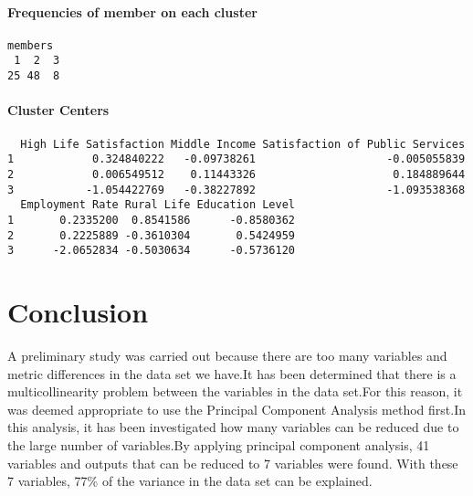 \documentclass[12pt,twoside]{deuthesis}
\newenvironment{Shaded}{\begin{snugshade}}{\end{snugshade}}
\newcommand{\FunctionTok}[1]{\textcolor[rgb]{0.00,0.00,0.00}{#1}}
\newcommand{\NormalTok}[1]{#1}
\newcommand{\OtherTok}[1]{\textcolor[rgb]{0.56,0.35,0.01}{#1}}
\newcommand{\SpecialCharTok}[1]{\textcolor[rgb]{0.00,0.00,0.00}{#1}}
\begin{document}
\hypertarget{frequencies-of-member-on-each-cluster}{%
\subsubsection{Frequencies of member on each cluster}\label{frequencies-of-member-on-each-cluster}}
\begin{Shaded}
\end{Shaded}
\begin{verbatim}
members
 1  2  3 
25 48  8 
\end{verbatim}
\hypertarget{cluster-centers}{%
\subsubsection{Cluster Centers}\label{cluster-centers}}
\begin{Shaded}
\end{Shaded}
\begin{verbatim}
  High Life Satisfaction Middle Income Satisfaction of Public Services
1            0.324840222   -0.09738261                    -0.005055839
2            0.006549512    0.11443326                     0.184889644
3           -1.054422769   -0.38227892                    -1.093538368
  Employment Rate Rural Life Education Level
1       0.2335200  0.8541586      -0.8580362
2       0.2225889 -0.3610304       0.5424959
3      -2.0652834 -0.5030634      -0.5736120
\end{verbatim}
\hypertarget{conclusion}{%
\chapter*{Conclusion}\label{conclusion}}

A preliminary study was carried out because there are too many variables and metric differences in the data set we have.It has been determined that there is a multicollinearity problem between the variables in the data set.For this reason, it was deemed appropriate to use the Principal Component Analysis method first.In this analysis, it has been investigated how many variables can be reduced due to the large number of variables.By applying principal component analysis, 41 variables and outputs that can be reduced to 7 variables were found. With these 7 variables, 77\% of the variance in the data set can be explained.\\
\end{document}
